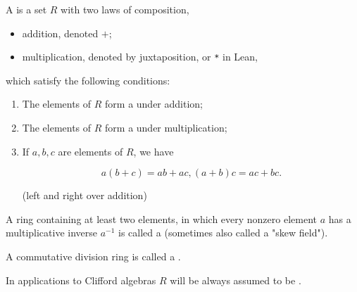 \begin{definition}[Ring]
    \label{ring}
    \leanok

    A  is a set $R$ with two laws of composition, 
    
    \begin{itemize}
        
    \item addition, denoted $+$;
    \item multiplication, denoted by juxtaposition, or \texttt{*} in Lean,
    
    \end{itemize}
    
    which satisfy the following conditions:

    \begin{enumerate}
    \item The elements of $R$ form a  under addition;

    \item The elements of $R$ form a  under multiplication;

    \item If $a, b, c$ are elements of $R$, we have

    $$
    a (b + c) = a b + a c, (a + b) c = a c + b c.
    $$

    (left and right  over addition)

    \end{enumerate}

\end{definition}

\begin{definition}
    \label{division_ring}
    \leanok

    A ring containing at least two elements, in which
    every nonzero element $a$ has a multiplicative inverse $a^{-1}$ is called a  
    (sometimes also called a "skew field").

\end{definition}

\begin{definition}[Field]
    \label{field}
    \leanok

    A commutative division ring is called a .

\end{definition}

\begin{remark}
    \label{mk:commutative_ring}

    In applications to Clifford algebras $R$ will be always assumed to be .
    
\end{remark}


